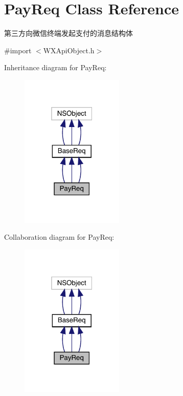 \hypertarget{interface_pay_req}{}\section{Pay\+Req Class Reference}
\label{interface_pay_req}


第三方向微信终端发起支付的消息结构体  




{\ttfamily \#import $<$W\+X\+Api\+Object.\+h$>$}



Inheritance diagram for Pay\+Req\+:\nopagebreak
\begin{figure}[H]
\begin{center}
\leavevmode
\includegraphics[width=139pt]{interface_pay_req__inherit__graph}
\end{center}
\end{figure}


Collaboration diagram for Pay\+Req\+:\nopagebreak
\begin{figure}[H]
\begin{center}
\leavevmode
\includegraphics[width=139pt]{interface_pay_req__coll__graph}
\end{center}
\end{figure}
